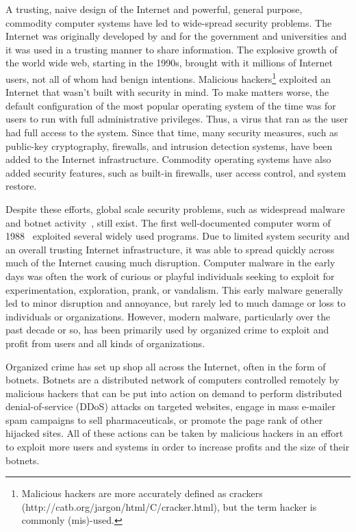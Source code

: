 A trusting, naive design of the Internet and powerful, general purpose, commodity computer systems have led to wide-spread security problems. The Internet was originally developed by and for the government and universities and it was used in a trusting manner to share information. The explosive growth of the world wide web, starting in the 1990s\cite{Paxson_growthtrends_1994}, brought with it millions of Internet users, not all of whom had benign intentions. Malicious hackers\footnote{Malicious hackers are more accurately defined as crackers (http://catb.org/jargon/html/C/cracker.html), but the term hacker is commonly (mis)-used.} exploited an Internet that wasn't built with security in mind. To make matters worse, the default configuration of the most popular operating system of the time was for users to run with full administrative privileges. Thus, a virus that ran as the user had full access to the system. Since that time, many security measures, such as public-key cryptography, firewalls, and intrusion detection systems, have been added to the Internet infrastructure. Commodity operating systems have also added security features, such as built-in firewalls, user access control, and system restore.

Despite these efforts, global scale security problems, such as widespread malware and botnet activity~\cite{conficker_09, special_ops_09,massive_botnet_09, iBotnet_09, leet09_malware, zombie_computers_nytimes_07}, still exist. The first well-documented computer worm of 1988~\cite{Spafford_1989} exploited several widely used programs. Due to limited system security and an overall trusting Internet infrastructure, it was able to spread quickly across much of the Internet causing much disruption. Computer malware in the early days was often the work of curious or playful individuals seeking to exploit for experimentation, exploration, prank, or vandalism. This early malware generally led to minor disruption and annoyance, but rarely led to much damage or loss to individuals or organizations. However, modern malware, particularly over the past decade or so, has been primarily used by organized crime to exploit and profit from users and all kinds of organizations\cite{paxson_sellingviagra_2009, verizon_data_breach_report_08, verizon_data_breach_report_09,verizon_data_breach_report_10}.

Organized crime has set up shop all across the Internet, often in the form of botnets. Botnets are a distributed network of computers controlled remotely by malicious hackers that can be put into action on demand to perform distributed denial-of-service (DDoS) attacks on targeted websites, engage in mass e-mailer spam campaigns to sell pharmaceuticals, or promote the page rank of other hijacked sites. All of these actions can be taken by malicious hackers in an effort to exploit more users and systems in order to increase profits and the size of their botnets.

